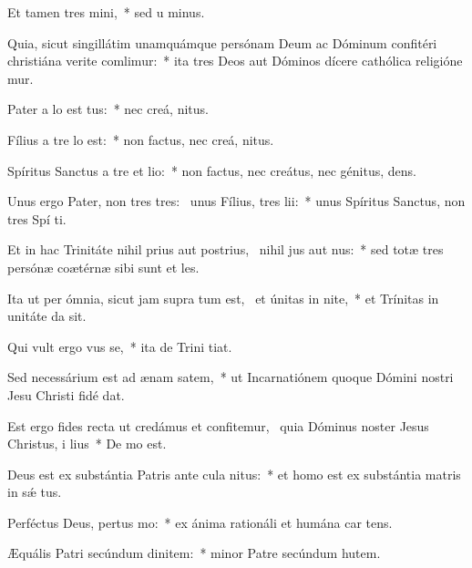\item Et tamen  tres mini,~* sed u  minus.
\item Quia, sicut singillátim unamquámque persónam Deum ac Dóminum confitéri christiána verite comlimur:~* ita tres Deos aut Dóminos dícere cathólica religióne mur.
\item Pater a lo est tus:~* nec creá,  nitus.
\item Fílius a tre lo est:~* non factus, nec creá,  nitus.
\item Spíritus Sanctus a tre et lio:~* non factus, nec creátus, nec génitus,  dens.
\item Unus ergo Pater, non tres tres:~\pscross{} unus Fílius,  tres lii:~* unus Spíritus Sanctus, non tres Spí ti.
\item Et in hac Trinitáte nihil prius aut postrius,~\pscross{} nihil jus aut nus:~* sed totæ tres persónæ coætérnæ sibi sunt et les.
\item Ita ut per ómnia, sicut jam supra tum est,~\pscross{} et únitas in nite,~* et Trínitas in unitáte da sit.
\item Qui vult ergo vus se,~* ita de Trini tiat.
\item Sed necessárium est ad ænam satem,~* ut Incarnatiónem quoque Dómini nostri Jesu Christi fidé dat.
\item Est ergo fides recta ut credámus et confitemur,~\pscross{} quia Dóminus noster Jesus Christus, i lius~* De  mo est.
\item Deus est ex substántia Patris ante cula nitus:~* et homo est ex substántia matris in sǽ tus.
\item Perféctus Deus, pertus mo:~* ex ánima rationáli et humána car tens.
\item Æquális Patri secúndum dinitem:~* minor Patre secúndum hutem.
